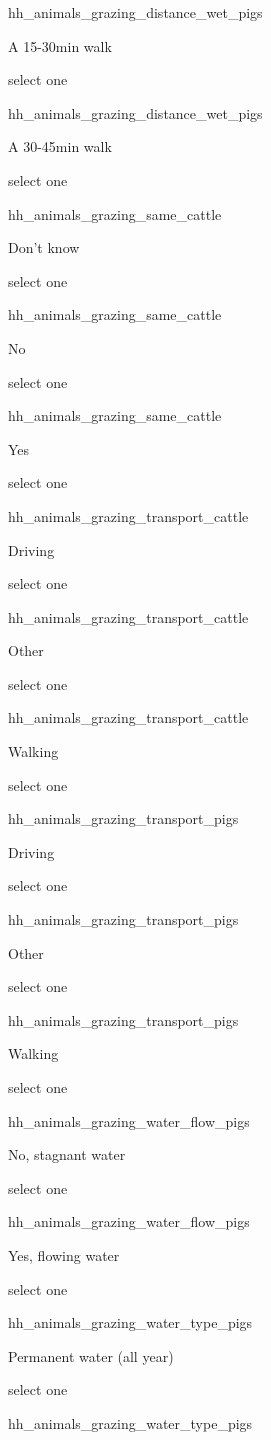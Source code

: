 \documentclass[]{article}
\begin{document}
hh\_animals\_grazing\_distance\_wet\_pigs

A 15-30min walk

select one

hh\_animals\_grazing\_distance\_wet\_pigs

A 30-45min walk

select one

hh\_animals\_grazing\_same\_cattle

Don't know

select one

hh\_animals\_grazing\_same\_cattle

No

select one

hh\_animals\_grazing\_same\_cattle

Yes

select one

hh\_animals\_grazing\_transport\_cattle

Driving

select one

hh\_animals\_grazing\_transport\_cattle

Other

select one

hh\_animals\_grazing\_transport\_cattle

Walking

select one

hh\_animals\_grazing\_transport\_pigs

Driving

select one

hh\_animals\_grazing\_transport\_pigs

Other

select one

hh\_animals\_grazing\_transport\_pigs

Walking

select one

hh\_animals\_grazing\_water\_flow\_pigs

No, stagnant water

select one

hh\_animals\_grazing\_water\_flow\_pigs

Yes, flowing water

select one

hh\_animals\_grazing\_water\_type\_pigs

Permanent water (all year)

select one

hh\_animals\_grazing\_water\_type\_pigs
\end{document}
